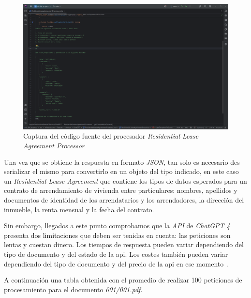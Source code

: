 \begin{figure}[ht]
    \begin{center}
        \includegraphics[width=\textwidth]{./chapter/4/images/chapter_4.4.residential_lease_agreement_processor}
        \caption{Captura del código fuente del procesador \textit{Residential Lease Agreement Processor}}
        \label{fig:chapter_4.4.residential_lease_agreement_processor}
    \end{center}
\end{figure}

Una vez que se obtiene la respuesta en formato \textit{JSON}, tan solo es necesario des serializar el mismo para
convertirlo en un objeto del tipo indicado, en este caso un \textit{Residential Lease Agreement} que contiene los tipos
de datos esperados para un contrato de arrendamiento de vivienda entre particulares: nombres, apellidos y
documentos de identidad de los arrendatarios y los arrendadores, la dirección del inmueble, la renta mensual y la fecha
del contrato.

Sin embargo, llegados a este punto comprobamos que la \textit{API} de \textit{ChatGPT 4} presenta dos limitaciones
que deben ser tenidas en cuenta: las peticiones son lentas y cuestan dinero.
Los tiempos de respuesta pueden variar dependiendo del tipo de documento y del estado de la api.
Los costes también pueden variar dependiendo del tipo de documento y del precio de la api en ese
momento~\cite{url_openai_api_pricing}.

A continuación una tabla obtenida con el promedio de realizar 100 peticiones de procesamiento para el documento
\textit{001/001.pdf}.

